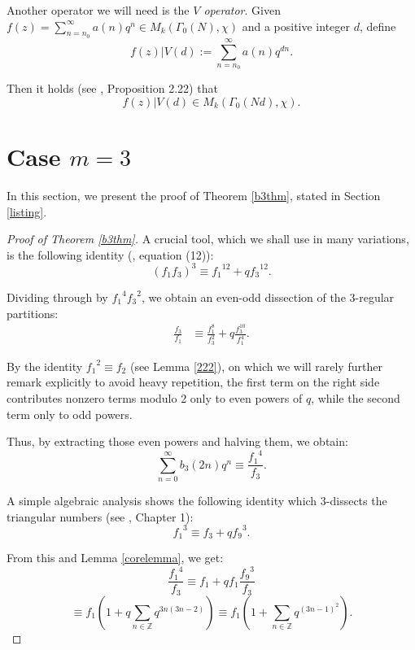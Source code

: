 \documentclass[12pt]{amsart}
\theoremstyle{definition}
\begin{document}
Another operator we will need is the \emph{$V$ operator}.  Given $f(z) = \sum_{n=n_0}^\infty a(n) q^n \in M_k(\Gamma_0(N),\chi)$ and a positive integer $d$, define $$f(z) \vert V(d) := \sum_{n=n_0}^\infty a(n) q^{dn}.$$ 

Then it holds (see \cite{Ono}, Proposition 2.22) that $$f(z) \vert V(d) \in M_k(\Gamma_0(Nd),\chi).$$


\section{Case $m=3$}\label{threesec}

In this section, we present the proof of Theorem \ref{b3thm}, stated in Section \ref{listing}.

\begin{proof}[Proof of Theorem \ref{b3thm}]  A crucial tool, which we shall use in many variations, is the following identity (\cite{JKZ}, equation (12)):
\begin{equation}\label{onethree}
(f_1 f_3)^3 \equiv {f_1}^{12} + q {f_3}^{12}.
\end{equation}

Dividing through by ${f_1}^4 {f_3}^2$, we obtain an even-odd dissection of the 3-regular partitions:
\begin{align}\label{3reg}
\frac{f_3}{f_1} &\equiv \frac{f_1^8}{f_3^2} + q \frac{f_3^{10}}{f_1^4}.
\end{align}

By the identity ${f_1}^2 \equiv f_2$ (see Lemma \ref{222}), on which we will rarely further remark explicitly to avoid heavy repetition, the first term on the right side contributes nonzero terms modulo 2 only to even powers of $q$, while the second term only to odd powers.  

Thus, by extracting those even powers and halving them, we obtain: $$\sum_{n=0}^\infty b_3(2n) q^n \equiv \frac{{f_1}^4}{f_3}.$$

A simple algebraic analysis shows the following identity which 3-dissects the triangular numbers (see \cite{Hirsch2}, Chapter 1): 
\begin{equation}\label{onecubed}
{f_1}^3 \equiv f_3 + q{f_9}^3.
\end{equation}

From this and Lemma \ref{corelemma}, we get:
$$\frac{{f_1}^4}{f_3} \equiv f_1 + q f_1 \frac{{f_9}^3}{f_3} $$$$\equiv f_1 \left( 1 + q \sum_{n \in \mathbb{Z}} q^{3n(3n-2)} \right) \equiv f_1 \left( 1 + \sum_{n \in \mathbb{Z}} q^{(3n-1)^2} \right).$$


\end{proof}
\end{document}
